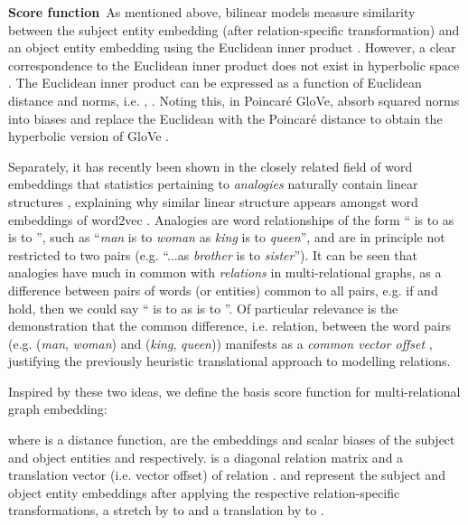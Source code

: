 \documentclass{article}
\newcommand{\keypoint}[1]{\vspace{0.cm}\noindent\textbf{#1}\,}
\begin{document}
\keypoint{Score function} As mentioned above, bilinear models measure similarity between the subject entity embedding (after relation-specific transformation) and an object entity embedding using the Euclidean inner product \cite{nickel2011three,yang2014embedding,trouillon2016complex, balazevic2019tucker}. However, a clear correspondence to the Euclidean inner product does not exist in hyperbolic space \cite{tifrea2019poincare}. The Euclidean inner product can be expressed as a function of Euclidean distance and norms, i.e. , . Noting this, in Poincar{\'e} GloVe, \citet{tifrea2019poincare} absorb squared norms into biases  and replace the Euclidean with the Poincar{\'e} distance  to obtain the hyperbolic version of GloVe \cite{pennington2014glove}. 

Separately, it has recently been shown in the closely related field of word embeddings that statistics pertaining to \textit{analogies} naturally contain linear structures \cite{allen2019analogies}, explaining why similar linear structure appears amongst word embeddings of word2vec \cite{mikolov2013distributed,mikolov2013linguistic,levy2014linguistic}. Analogies are word relationships of the form `` is to  as  is to '', such as ``\textit{man} is to \textit{woman} as \textit{king} is to \textit{queen}'', and are in principle not restricted to two pairs (e.g. ``...as \textit{brother} is to \textit{sister}''). It can be seen that analogies have much in common with \textit{relations} in multi-relational graphs, as a difference between pairs of words (or entities) common to all pairs, e.g. if  and  hold, then we could say `` is to  as  is to ''. Of particular relevance is the demonstration that the common difference, i.e. relation, between the word pairs (e.g. (\textit{man}, \textit{woman}) and (\textit{king}, \textit{queen})) manifests as a \textit{common vector offset} \cite{allen2019analogies}, justifying the previously heuristic translational approach to modelling relations.

Inspired by these two ideas, we define the basis score function for multi-relational graph embedding:

where  is a distance function,  are the embeddings and  scalar biases of the subject and object entities  and  respectively.  is a diagonal relation matrix  and  a translation vector (i.e. vector offset) of relation .  and  represent the subject and object entity embeddings after applying the respective relation-specific transformations, a stretch by  to  and a translation by  to . 
\end{document}
